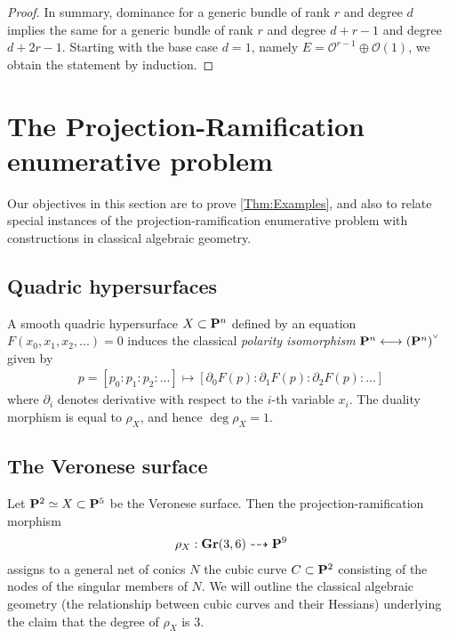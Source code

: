 \documentclass[11pt,reqno]{amsart}
\theoremstyle{plain}
\theoremstyle{definition}
\theoremstyle{remark}
\numberwithin{equation}{section}
\numberwithin{equation}{section}
\renewcommand{\O}{\mathcal O}
\newcommand{\smvee}{\raise0.5ex\hbox{$\scriptscriptstyle\vee$}}
\begin{document}
\begin{proof}
  In summary, dominance for a generic bundle of rank $r$ and degree $d$ implies the same for a generic bundle of rank $r$ and degree $d+r-1$ and degree $d+2r-1$.
  Starting with the base case $d = 1$, namely $E = \O^{r-1} \oplus \O(1)$, we obtain the statement by induction.
\end{proof}


\section{The Projection-Ramification enumerative problem} %
\label{sec:enumerativeproblems}

Our objectives in this section are to prove \autoref{Thm:Examples}, and also to relate special instances of the projection-ramification enumerative problem with constructions in classical algebraic geometry.


\subsection{Quadric hypersurfaces} %
\label{sub:a_quadric_surface}
A smooth quadric hypersurface $X \subset \P^{n}$ defined by an equation $F(x_{0},x_{1},x_{2}, ...) = 0$ induces the classical {\sl polarity isomorphism} $\P^{n} \longleftrightarrow (\P^{n})^{\smvee}$ given by 
\begin{align*}
  p = [p_{0}:p_{1}:p_{2}: ...] \mapsto [\partial_{0}F(p):\partial_{1}F(p):\partial_{2}F(p): ...]
\end{align*}
where $\partial_{i}$ denotes derivative with respect to the $i$-th variable $x_{i}$. The duality morphism is equal to $\rho_{X}$, and hence $\deg \rho_{X} = 1$.  



\subsection{The Veronese surface} %

Let $\P^{2} \simeq X \subset \P^{5}$ be the Veronese surface. Then the projection-ramification morphism 
\begin{align*}
  \rho_{X}: \Gr(3,6) \dashrightarrow \P^{9}
\end{align*}
assigns to a general net of conics $N$ the cubic curve $C \subset \P^{2}$ consisting of the nodes of the singular members of $N$.  We will outline the classical algebraic geometry (the relationship between cubic curves and their Hessians) underlying the claim that the degree of $\rho_{X}$ is $3$. 
\end{document}
